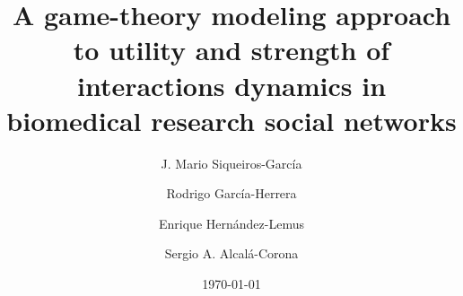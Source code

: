 \documentclass[11pt]{article}
\begin{document}
\title{A game-theory modeling approach to utility
  and strength of interactions dynamics in biomedical research social networks}





\author{J. Mario Siqueiros-Garc\'ia         \and      Rodrigo Garc\'ia-Herrera \and         Enrique Hern\'andez-Lemus \and
        Sergio A. Alcal\'a-Corona  %
}



\date{\today}


\maketitle
\end{document}
